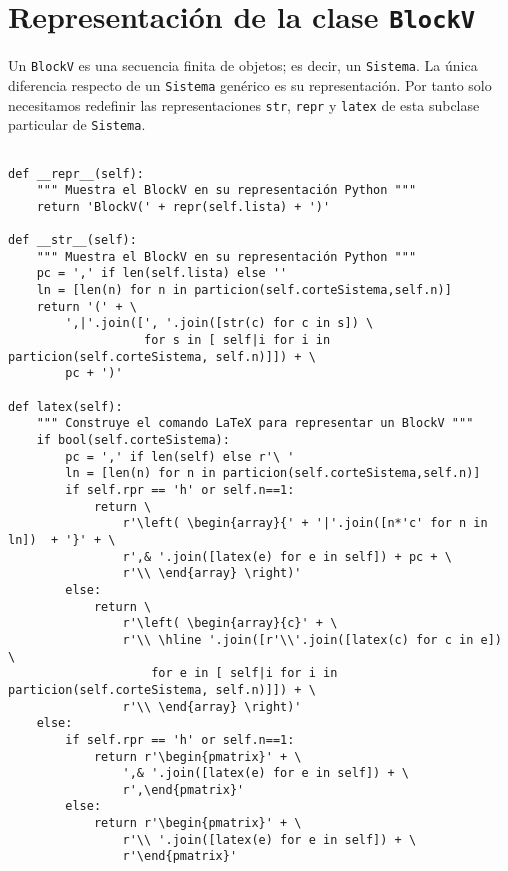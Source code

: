 \documentclass[11pt]{report}
\begin{document}
\section{Representación de la clase \texttt{BlockV}}
\label{sec:org1bf7eb9}
Un \texttt{BlockV} es una secuencia finita de objetos; es decir, un
\texttt{Sistema}.  La única diferencia respecto de un \texttt{Sistema} genérico es
su representación. Por tanto solo necesitamos redefinir las
representaciones \texttt{str}, \texttt{repr} y \texttt{latex} de esta subclase particular
de \texttt{Sistema}.

\begin{verbatim}

def __repr__(self):
    """ Muestra el BlockV en su representación Python """
    return 'BlockV(' + repr(self.lista) + ')'
                           
def __str__(self):
    """ Muestra el BlockV en su representación Python """
    pc = ',' if len(self.lista) else ''
    ln = [len(n) for n in particion(self.corteSistema,self.n)]
    return '(' + \
        ',|'.join([', '.join([str(c) for c in s]) \
                   for s in [ self|i for i in particion(self.corteSistema, self.n)]]) + \
        pc + ')'

def latex(self):
    """ Construye el comando LaTeX para representar un BlockV """
    if bool(self.corteSistema):
        pc = ',' if len(self) else r'\ '
        ln = [len(n) for n in particion(self.corteSistema,self.n)]
        if self.rpr == 'h' or self.n==1:    
            return \
                r'\left( \begin{array}{' + '|'.join([n*'c' for n in ln])  + '}' + \
                r',& '.join([latex(e) for e in self]) + pc + \
                r'\\ \end{array} \right)'
        else:
            return \
                r'\left( \begin{array}{c}' + \
                r'\\ \hline '.join([r'\\'.join([latex(c) for c in e]) \
                    for e in [ self|i for i in particion(self.corteSistema, self.n)]]) + \
                r'\\ \end{array} \right)'
    else:
        if self.rpr == 'h' or self.n==1:
            return r'\begin{pmatrix}' + \
                ',& '.join([latex(e) for e in self]) + \
                r',\end{pmatrix}'
        else:
            return r'\begin{pmatrix}' + \
                r'\\ '.join([latex(e) for e in self]) + \
                r'\end{pmatrix}'

\end{verbatim}
\end{document}
